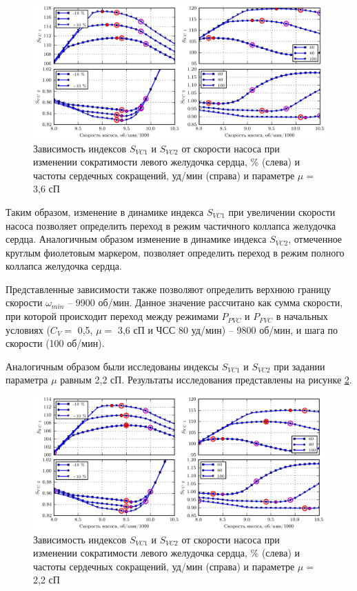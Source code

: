 \begin{figure}[ht] 
  \center
  \includegraphics [scale=1.0] {../images/c3_pvc_fvc_36}
  \caption{Зависимость индексов $S_{VC1}$ и $S_{VC2}$ от скорости насоса при изменении сократимости левого желудочка сердца, \% (слева) и частоты сердечных сокращений, уд/мин (справа) и параметре $\mu =$ 3,6 сП} 
  \label{img:pumping_states_pvc_fvc_36}  
\end{figure}

Таким образом, изменение в динамике индекса $S_{VC1}$ при увеличении скорости насоса позволяет определить переход в режим частичного коллапса желудочка сердца. Аналогичным образом изменение в динамике индекса $S_{VC2}$, отмеченное круглым фиолетовым маркером, позволяет определить переход в режим полного коллапса желудочка сердца. 

Представленные зависимости также позволяют определить верхнюю границу скорости $\omega_{min}$ -- 9900 об/мин. Данное значение рассчитано как сумма скорости, при которой происходит переход между режимами $P_{PVC}$ и $P_{FVC}$ в начальных условиях ($C_V =$ 0,5, $\mu =$ 3,6 сП и ЧСС 80 уд/мин) -- 9800 об/мин, и шага по скорости (100 об/мин).

Аналогичным образом были исследованы индексы $S_{VC1}$ и $S_{VC2}$ при задании параметра $\mu$ равным 2,2 сП. Результаты исследования представлены на рисунке \ref{img:pumping_states_pvc_fvc_22}.

\begin{figure}[ht] 
  \center
  \includegraphics [scale=1.0] {../images/c3_pvc_fvc_22}
  \caption{Зависимость индексов $S_{VC1}$ и $S_{VC2}$ от скорости насоса при изменении сократимости левого желудочка сердца, \% (слева) и частоты сердечных сокращений, уд/мин (справа) и параметре $\mu =$ 2,2 сП} 
  \label{img:pumping_states_pvc_fvc_22}  
\end{figure}

